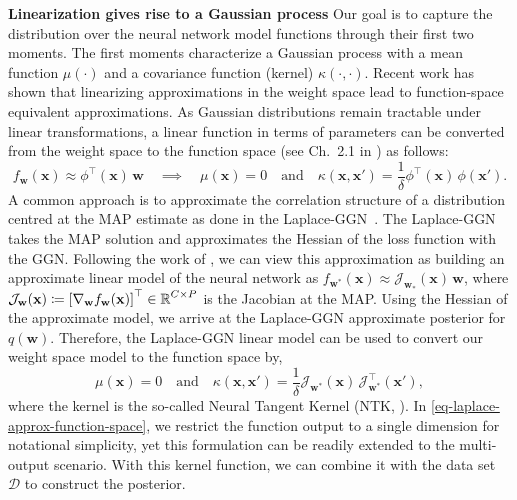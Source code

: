 \documentclass{article}
\newcommand{\dataset}{\ensuremath{\mathcal{D}}}
\newcommand{\weights}{\ensuremath{\mathbf{w}}}
\newcommand{\mbf}[1]{\mathbf{#1}}
\newcommand{\T}{\top}
\newcommand{\vx}{\mbf{x}}
\newcommand{\vw}{\mbf{w}}
\newcommand{\Jac}[2]{\mathcal{J}_{#1}(#2)}
\newcommand{\JacT}[2]{\mathcal{J}_{#1}^\top(#2)}
\newcommand{\GP}{\mathcal{GP}}
\begin{document}
\textbf{Linearization gives rise to a Gaussian process}
Our goal is to capture the distribution over the neural network model functions through their first two moments. The first moments characterize a Gaussian process with a mean function $\mu(\cdot)$ and a covariance function (kernel) $\kappa(\cdot,\cdot)$. 
Recent work \cite{khan2019approximate,maddox2021fast} has shown that linearizing approximations in the weight space lead to function-space equivalent approximations.
As Gaussian distributions remain tractable under linear transformations, a linear function in terms of parameters can be converted from the weight space to the function space (see Ch.~2.1 in \cite{rasmussen2006gaussian}) as follows:
%
\begin{equation} \label{eq:weight_func}
f_\weights(\vx) \approx 
\phi^\top\!(\vx) \, \vw \quad\implies\quad \mu(\vx) = 0 \quad \text{and} \quad \kappa(\vx, \vx') = \frac{1}{\delta} \phi^\T\!(\vx) \, \phi(\vx').
\end{equation}
A common approach is to approximate the correlation structure of a distribution centred at the MAP estimate as done in the Laplace-GGN~\cite{khan2019approximate, daxberger2021laplace, maddox2021fast}. 
The Laplace-GGN takes the MAP solution and approximates the Hessian of the loss function
with the GGN.
Following the work of \citet{khan2019approximate}, we can view this approximation as building an approximate linear model of the neural network as $f_{\weights^*}(\vx) \approx 
\Jac{\weights_*}{\vx} \, \weights$, where $\Jac{\weights}{\vx} \coloneqq \left[ \nabla_\weights f_\weights(\vx)\right]^\top \in \R^{C \times P}$ is the Jacobian at the MAP.
Using the Hessian of the approximate model, we arrive at the Laplace-GGN approximate posterior for $q(\vw)$. 
Therefore, the Laplace-GGN linear model can be used to convert our weight space model to the function space by,
\begin{equation} 
\label{eq-laplace-approx-function-space} 
  \mu(\vx) =  0 \quad \text{and} \quad
  \kappa(\vx, \vx')
  = \frac{1}{\delta} \Jac{\weights^*}{\vx} \, \JacT{\weights^*}{\vx'}, 
\end{equation}
where the kernel is the so-called Neural Tangent Kernel (NTK, \cite{jacot2018neural}). In \cref{eq-laplace-approx-function-space}, we restrict the function output to a single dimension for notational simplicity, yet this formulation can be readily extended to the multi-output scenario. With this kernel function, we can combine it with the data set $\dataset$ to construct the posterior. 
\end{document}
